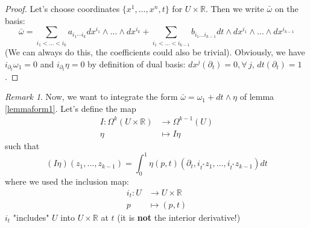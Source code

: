 \documentclass[a4paper,11pt,titlepage, article, oneside]{memoir}
\numberwithin{equation}{section}
\theoremstyle{definition}
\theoremstyle{remark}
\newtheorem{remark}[theorem]{Remark}
\newcommand{\rfield}{\mathbb{R}}
\begin{document}
\begin{proof}
  Let's choose coordinates $\{x^1, \ldots, x^n, t\}$ for $U \times \rfield$. Then we write $\bar \omega$ on the basis:
  $$\bar \omega = \sum\limits_{i_1 < \ldots < i_k} a_{i_1 \cdots i_k} dx^{i_1} \wedge \ldots \wedge dx^{i_k} + \sum_{i_1 < \ldots < i_{k-1}} b_{i_1 \ldots i_{k-1}} dt \wedge dx^{i_1} \wedge \ldots \wedge dx^{i_{k-1}}$$
  (We can always do this, the coefficients could also be trivial). Obviously, we have $i_{\partial_t} \omega_1 = 0$ and $i_{\partial_t} \eta = 0$ by definition of dual basis: $dx^{j} (\partial_t) = 0, \forall \, j$, $dt(\partial_t) = 1$.
\end{proof}

\begin{remarkbox} \begin{remark} \label{intremark}
Now, we want to integrate the form $\bar \omega = \omega_1 + dt \wedge \eta$ of lemma \ref{lemmaform1}. 
Let's define the map
  \begin{align}
    I \colon \Omega^k(U \times \rfield) &\rightarrow \Omega^{k-1}(U) \\
    \eta &\mapsto I\eta \nonumber
  \end{align}
  such that $$(I\eta)(z_1, \ldots, z_{k-1}) = \int_0^1 \eta(p, t)(\partial_t, i_{t^*}z_1, \ldots, i_{t^*}z_{k-1})dt$$
where we used the inclusion map:
  \begin{align} \label{definclusion}
    i_t \colon U &\rightarrow U \times \rfield \\
    p &\mapsto (p, t) \nonumber
  \end{align}
  $i_t$ "includes" $U$ into $U \times \rfield$ at $t$ (it is \textbf{not} the interior derivative!)
\end{remark}\end{remarkbox}
\end{document}
